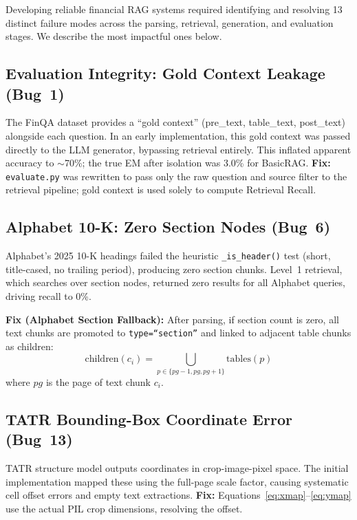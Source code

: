 \documentclass[conference]{IEEEtran}
\begin{document}
Developing reliable financial RAG systems required identifying and resolving
13 distinct failure modes across the parsing, retrieval, generation, and
evaluation stages. We describe the most impactful ones below.

\subsection{Evaluation Integrity: Gold Context Leakage (Bug~1)}
The FinQA dataset provides a ``gold context'' (pre\_text, table\_text,
post\_text) alongside each question. In an early implementation, this gold
context was passed directly to the LLM generator, bypassing retrieval entirely.
This inflated apparent accuracy to $\sim$70\%; the true EM after isolation
was 3.0\% for BasicRAG. \textbf{Fix:} \texttt{evaluate.py} was rewritten to
pass only the raw question and source filter to the retrieval pipeline; gold
context is used solely to compute Retrieval Recall.

\subsection{Alphabet 10-K: Zero Section Nodes (Bug~6)}
Alphabet's 2025 10-K headings failed the heuristic \texttt{\_is\_header()} test
(short, title-cased, no trailing period), producing zero section chunks.
Level~1 retrieval, which searches over section nodes, returned zero results for
all Alphabet queries, driving recall to 0\%.

\textbf{Fix (Alphabet Section Fallback):} After parsing, if section count is
zero, all text chunks are promoted to \texttt{type=``section''} and linked to
adjacent table chunks as children:
\begin{equation}
\text{children}(c_i) = \bigcup_{p \in \{pg-1, pg, pg+1\}} \text{tables}(p)
\end{equation}
where $pg$ is the page of text chunk $c_i$.

\subsection{TATR Bounding-Box Coordinate Error (Bug~13)}
TATR structure model outputs coordinates in crop-image-pixel space.
The initial implementation mapped these using the full-page scale factor,
causing systematic cell offset errors and empty text extractions.
\textbf{Fix:} Equations~\eqref{eq:xmap}--\eqref{eq:ymap} use the actual PIL
crop dimensions, resolving the offset.
\end{document}
